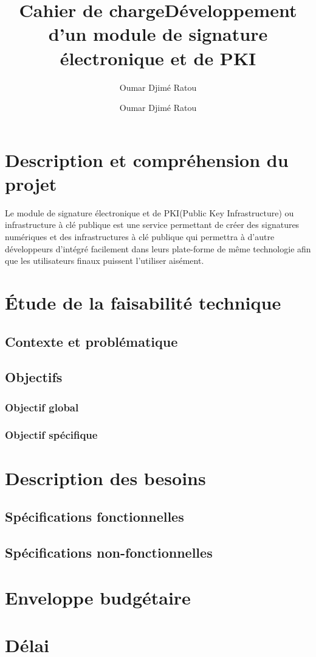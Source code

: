 \documentclass[12pt,a4paper]{article}
\author{Oumar Djimé Ratou}
\title{Cahier de charge}
\title{Développement d'un module de signature électronique et de PKI}
\author{Oumar Djimé Ratou}
\begin{document}
\maketitle


\newpage
\tableofcontents
\newpage





\section{Description et compréhension du projet}
Le module de signature électronique et de PKI(Public Key Infrastructure) ou infrastructure à clé publique est une service permettant de créer des signatures numériques et des infrastructures à clé publique qui permettra à d'autre développeurs d'intégré facilement dans leurs plate-forme de même technologie afin que les utilisateurs finaux puissent l'utiliser aisément.

\section{Étude de la faisabilité technique}
	\subsection{Contexte et problématique}
	\subsection{Objectifs}
	\subsubsection{Objectif global}
	\subsubsection{Objectif spécifique}


\section{Description des besoins}
	\subsection{Spécifications fonctionnelles}
	\subsection{Spécifications non-fonctionnelles}

\section{Enveloppe budgétaire}

\section{Délai}
\end{document}
